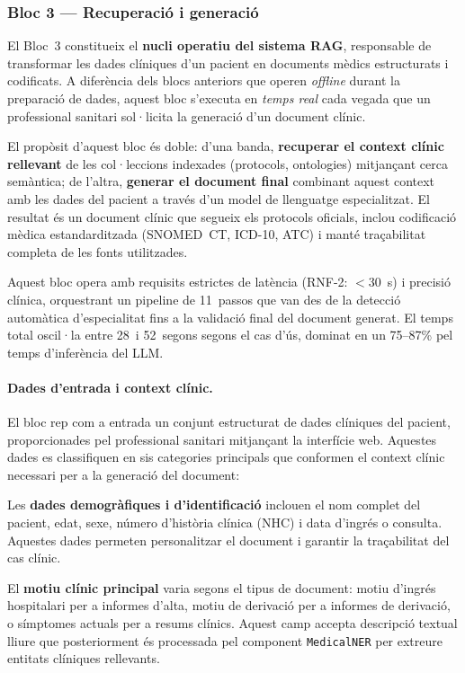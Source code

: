 \documentclass[CAT]{TFUOC}%
\begin{document}
\subsubsection*{Bloc 3 --- Recuperació i generació}

El Bloc~3 constitueix el \textbf{nucli operatiu del sistema RAG}, responsable de transformar les dades clíniques d'un pacient en documents mèdics estructurats i codificats. A diferència dels blocs anteriors que operen \textit{offline} durant la preparació de dades, aquest bloc s'executa en \textit{temps real} cada vegada que un professional sanitari sol·licita la generació d'un document clínic.

El propòsit d'aquest bloc és doble: d'una banda, \textbf{recuperar el context clínic rellevant} de les col·leccions indexades (protocols, ontologies) mitjançant cerca semàntica; de l'altra, \textbf{generar el document final} combinant aquest context amb les dades del pacient a través d'un model de llenguatge especialitzat. El resultat és un document clínic que segueix els protocols oficials, inclou codificació mèdica estandarditzada (SNOMED~CT, ICD-10, ATC) i manté traçabilitat completa de les fonts utilitzades.

Aquest bloc opera amb requisits estrictes de latència (RNF-2: $<$30~s) i precisió clínica, orquestrant un pipeline de 11~passos que van des de la detecció automàtica d'especialitat fins a la validació final del document generat. El temps total oscil·la entre 28~i 52~segons segons el cas d'ús, dominat en un 75--87\% pel temps d'inferència del LLM.

\paragraph{Dades d'entrada i context clínic.}

El bloc rep com a entrada un conjunt estructurat de dades clíniques del pacient, proporcionades pel professional sanitari mitjançant la interfície web. Aquestes dades es classifiquen en sis categories principals que conformen el context clínic necessari per a la generació del document:

Les \textbf{dades demogràfiques i d'identificació} inclouen el nom complet del pacient, edat, sexe, número d'història clínica (NHC) i data d'ingrés o consulta. Aquestes dades permeten personalitzar el document i garantir la traçabilitat del cas clínic.

El \textbf{motiu clínic principal} varia segons el tipus de document: motiu d'ingrés hospitalari per a informes d'alta, motiu de derivació per a informes de derivació, o símptomes actuals per a resums clínics. Aquest camp accepta descripció textual lliure que posteriorment és processada pel component \texttt{MedicalNER} per extreure entitats clíniques rellevants.
\end{document}
